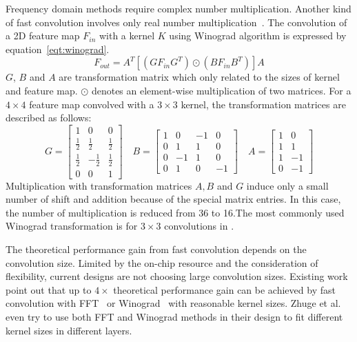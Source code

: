 Frequency domain methods require complex number multiplication. Another kind of fast convolution involves only real number multiplication~\cite{winograd1980arithmetic}. The convolution of a 2D feature map $F_{in}$ with a kernel $K$ using Winograd algorithm is expressed by equation~\ref{eqt:winograd}.
\begin{equation}\label{eqt:winograd}
    F_{out} = A^T[(GF_{in}G^T)\odot(BF_{in}B^T)]A
\end{equation}
$G$, $B$ and $A$ are transformation matrix which only related to the sizes of kernel and feature map. $\odot$ denotes an element-wise multiplication of two matrices. For a $4\times 4$ feature map convolved with a $3\times 3$ kernel, the transformation matrices are described as follows:
\begin{equation*}
    G = \left[
        \begin{array}{ccc}
            1           & 0            & 0           \\
            \frac{1}{2} & \frac{1}{2}  & \frac{1}{2} \\
            \frac{1}{2} & -\frac{1}{2} & \frac{1}{2} \\
            0           & 0            & 1
        \end{array}    
    \right] \quad
    B = \left[
        \begin{array}{cccc}
            1 & 0  & -1 & 0 \\
            0 & 1  & 1  & 0 \\
            0 & -1 & 1  & 0 \\
            0 & 1  & 0  & -1
        \end{array}
    \right] \quad
    A = \left[
        \begin{array}{cc}
            1 & 0  \\
            1 & 1  \\
            1 & -1 \\
            0 & -1 
        \end{array}
    \right]
\end{equation*}
Multiplication with transformation matrices $A, B$ and $G$ induce only a small number of shift and addition because of the special matrix entries. In this case, the number of multiplication is reduced from 36 to 16.The most commonly used Winograd transformation is for $3\times 3$ convolutions in \cite{lu2017evaluating, xiao2017exploring}. 

The theoretical performance gain from fast convolution depends on the convolution size. Limited by the on-chip resource and the consideration of flexibility, current designs are not choosing large convolution sizes. Existing work point out that up to $4\times$ theoretical performance gain can be achieved by fast convolution with FFT~\cite{zhang2017frequency} or Winograd~\cite{lu2017evaluating} with reasonable kernel sizes. Zhuge et al.~\cite{zhuge2018face} even try to use both FFT and Winograd methods in their design to fit different kernel sizes in different layers.

